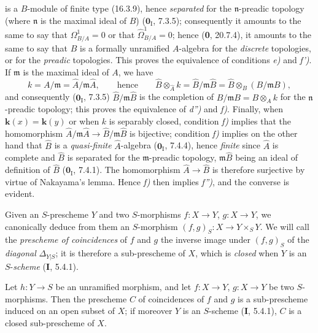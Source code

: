 is a $B$-module of finite type (16.3.9), hence \emph{separated} for the $\mathfrak n$-preadic topology (where $\mathfrak n$ is the maximal ideal of $B$) ($\mathbf{0}_{\mathrm I}$, 7.3.5); consequently it amounts to the same to say that $\Omega^1_{B/A}=0$ or that $\widehat{\Omega}^1_{B/A}=0$; hence (\textbf{0}, 20.7.4), it amounts to the same to say that $B$ is a formally unramified $A$-algebra for the \emph{discrete} topologies, or for the \emph{preadic} topologies. This proves the equivalence of conditions \emph{e)} and \emph{f')}. If $\mathfrak m$ is the maximal ideal of $A$, we have
\[
k=A/\mathfrak m=\widehat A/\mathfrak m\widehat A,
\qquad\text{hence}\qquad
\widehat B\otimes_{\widehat A}k=\widehat B/\mathfrak m\widehat B
=\widehat B\otimes_B(B/\mathfrak m B),
\]
and consequently ($\mathbf{0}_{\mathrm I}$, 7.3.5) $\widehat B/\mathfrak m\widehat B$ is the completion of $B/\mathfrak m B=B\otimes_A k$ for the $\mathfrak n$-preadic topology; this proves the equivalence of \emph{d'')} and \emph{f)}. Finally, when $\boldsymbol{k}(x)=\boldsymbol{k}(y)$ or when $k$ is separably closed, condition \emph{f)} implies that the homomorphism $\widehat A/\mathfrak m\widehat A\to\widehat B/\mathfrak m\widehat B$ is bijective; condition \emph{f)} implies on the other hand that $\widehat B$ is a \emph{quasi-finite} $\widehat A$-algebra ($\mathbf{0}_{\mathrm I}$, 7.4.4), hence \emph{finite} since $\widehat A$ is complete and $\widehat B$ is separated for the $\mathfrak m$-preadic topology, $\mathfrak m\widehat B$ being an ideal of definition of $\widehat B$ ($\mathbf{0}_{\mathrm I}$, 7.4.1). The homomorphism $\widehat A\to\widehat B$ is therefore surjective by virtue of Nakayama's lemma. Hence \emph{f)} then implies \emph{f'')}, and the converse is evident.

\begin{env}[17.4.5]\label{IV.17.4.5}
Given an $S$-prescheme $Y$ and two $S$-morphisms $f:X\to Y$, $g:X\to Y$, we canonically deduce from them an $S$-morphism $(f,g)_S:X\to Y\times_S Y$. We will call the \emph{prescheme of coincidences} of $f$ and $g$ the inverse image under $(f,g)_S$ of the \emph{diagonal} $\Delta_{Y|S}$; it is therefore a sub-prescheme of $X$, which is \emph{closed} when $Y$ is an $S$-\emph{scheme} (\textbf{I}, 5.4.1).
\end{env}

\begin{proposition}[17.4.6]
\label{IV.17.4.6}
Let $h:Y\to S$ be an unramified morphism, and let $f:X\to Y$, $g:X\to Y$ be two $S$-morphisms. Then the prescheme $C$ of coincidences of $f$ and $g$ is a sub-prescheme induced on an open subset of $X$; if moreover $Y$ is an $S$-scheme \textup{(\textbf{I}, 5.4.1)}, $C$ is a closed sub-prescheme of $X$.
\end{proposition}

